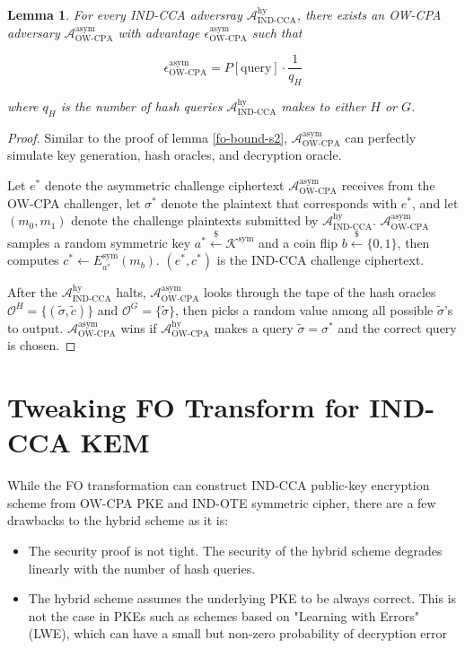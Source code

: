 \documentclass{article}
\newcommand{\leftsample}{\overset{{\scriptscriptstyle\$}}{\leftarrow}}
\newtheorem{lemma}{Lemma}[theorem]
\begin{document}
\begin{lemma}
    For every IND-CCA adversray $\mathcal{A}^\text{hy}_\text{IND-CCA}$, there exists an OW-CPA adversary $\mathcal{A}^\text{asym}_\text{OW-CPA}$ with advantage $\epsilon^\text{asym}_\text{OW-CPA}$ such that

    $$
    \epsilon^\text{asym}_\text{OW-CPA} = P[\text{query}] \cdot \frac{1}{q_H}
    $$

    where $q_H$ is the number of hash queries $\mathcal{A}^\text{hy}_\text{IND-CCA}$ makes to either $H$ or $G$.
\end{lemma}

\begin{proof}
    Similar to the proof of lemma \ref{fo-bound-s2}, $\mathcal{A}^\text{asym}_\text{OW-CPA}$ can perfectly simulate key generation, hash oracles, and decryption oracle.

    Let $e^\ast$ denote the asymmetric challenge ciphertext $\mathcal{A}^\text{asym}_\text{OW-CPA}$ receives from the OW-CPA challenger, let $\sigma^\ast$ denote the plaintext that corresponds with $e^\ast$, and let $(m_0, m_1)$ denote the challenge plaintexts submitted by $\mathcal{A}^\text{hy}_\text{IND-CCA}$. $\mathcal{A}^\text{asym}_\text{OW-CPA}$ samples a random symmetric key $a^\ast \leftsample \mathcal{K}^\text{sym}$ and a coin flip $b \leftsample \{0, 1\}$, then computes $c^\ast \leftarrow E^\text{sym}_{a^\ast}(m_b)$. $(e^\ast, c^\ast)$ is the IND-CCA challenge ciphertext.

    After the $\mathcal{A}^\text{hy}_\text{IND-CCA}$ halts, $\mathcal{A}^\text{asym}_\text{OW-CPA}$ looks through the tape of the hash oracles $\mathcal{O}^H = \{(\tilde{\sigma}, \tilde{c})\}$ and $\mathcal{O}^G = \{\tilde{\sigma}\}$, then picks a random value among all possible $\tilde{\sigma}$'s to output. $\mathcal{A}^\text{asym}_\text{OW-CPA}$ wins if $\mathcal{A}^\text{hy}_\text{OW-CPA}$ makes a query $\tilde{\sigma} = \sigma^\ast$ and the correct query is chosen.
\end{proof}

\section{Tweaking FO Transform for IND-CCA KEM}
While the FO transformation can construct IND-CCA public-key encryption scheme from OW-CPA PKE and IND-OTE symmetric cipher, there are a few drawbacks to the hybrid scheme as it is:

\begin{itemize}
    \item The security proof is not tight. The security of the hybrid scheme degrades linearly with the number of hash queries.
    \item The hybrid scheme assumes the underlying PKE to be always correct. This is not the case in PKEs such as schemes based on "Learning with Errors" (LWE), which can have a small but non-zero probability of decryption error
\end{itemize}
\end{document}
